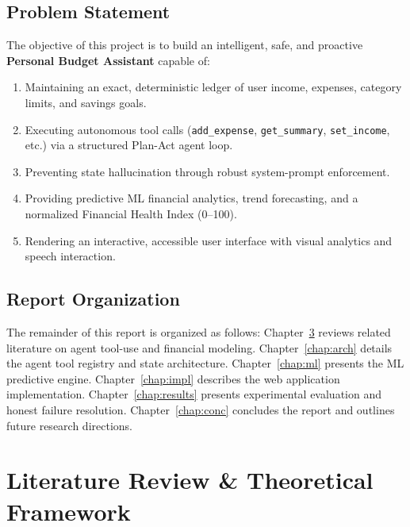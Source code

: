 \documentclass[12pt,a4paper,oneside]{report}
\begin{document}
\section{Problem Statement}
The objective of this project is to build an intelligent, safe, and proactive \textbf{Personal Budget Assistant} capable of:
\begin{enumerate}
    \item Maintaining an exact, deterministic ledger of user income, expenses, category limits, and savings goals.
    \item Executing autonomous tool calls (\texttt{add\_expense}, \texttt{get\_summary}, \texttt{set\_income}, etc.) via a structured Plan-Act agent loop.
    \item Preventing state hallucination through robust system-prompt enforcement.
    \item Providing predictive ML financial analytics, trend forecasting, and a normalized Financial Health Index (0--100).
    \item Rendering an interactive, accessible user interface with visual analytics and speech interaction.
\end{enumerate}

\section{Report Organization}
The remainder of this report is organized as follows: Chapter~\ref{chap:lit} reviews related literature on agent tool-use and financial modeling. Chapter~\ref{chap:arch} details the agent tool registry and state architecture. Chapter~\ref{chap:ml} presents the ML predictive engine. Chapter~\ref{chap:impl} describes the web application implementation. Chapter~\ref{chap:results} presents experimental evaluation and honest failure resolution. Chapter~\ref{chap:conc} concludes the report and outlines future research directions.

\chapter{Literature Review \& Theoretical Framework}
\label{chap:lit}
\end{document}
